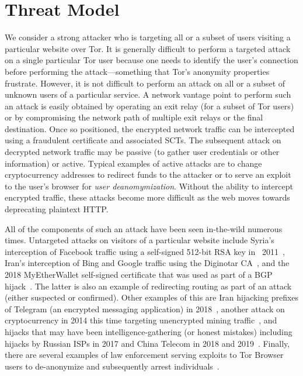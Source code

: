 \section{Threat Model} \label{sec:adversary}
We consider a strong attacker who is targeting all or a subset of users visiting
a particular website over Tor. It is generally difficult to perform a targeted
attack on a single particular Tor user because one needs to identify the user's
connection before performing the attack---something that Tor's
anonymity properties frustrate.
However, it is not difficult to perform an attack on all or a subset of unknown
users of a particular service. A network vantage point to perform such an attack
is easily obtained by operating an exit relay (for a subset of Tor users) or by
compromising the network path of multiple exit relays or the final destination.
Once so positioned, the encrypted network traffic can be intercepted using a
fraudulent certificate and associated SCTs.  The subsequent attack on decrypted
network traffic
may be passive (to gather user credentials or other information) or active.
Typical examples of active attacks are to change cryptocurrency addresses to
redirect funds to the attacker or to serve an exploit to the user's browser for
\emph{user deanomymization}. Without the ability to intercept encrypted traffic,
these attacks become more difficult as the web moves towards deprecating
plaintext HTTP.

All of the components of such an attack have been seen in-the-wild
numerous times. Untargeted attacks on visitors of a particular website
include Syria's interception of Facebook traffic using a self-signed
512-bit RSA key in ~2011~\cite{syria-facebook-mitm}, Iran's
interception of Bing and Google traffic using the Diginotar
CA~\cite{diginotar,ct/a}, and the 2018 MyEtherWallet
self-signed certificate that was used as part of a BGP
hijack~\cite{ethereum-hijack-isoc}.  The latter is also an example of
redirecting routing as part of an attack (either suspected or
confirmed). Other examples of this are Iran hijacking prefixes of
Telegram (an encrypted messaging application) in
2018~\cite{iran-telegram-bgp}, another attack on cryptocurrency in
2014 this time targeting unencrypted mining
traffic~\cite{bgp-hijacking-for-crypto},
and hijacks that may have been intelligence-gathering (or honest
mistakes) including hijacks by Russian ISPs in 2017 and China Telecom
in 2018 and 2019~\cite{wiki-bgp}.  Finally, there are several examples of 
law enforcement serving exploits to Tor Browser users to de-anonymize and
subsequently arrest individuals~\cite{forbes-fbi-tor,doj-fbi-tor}.

